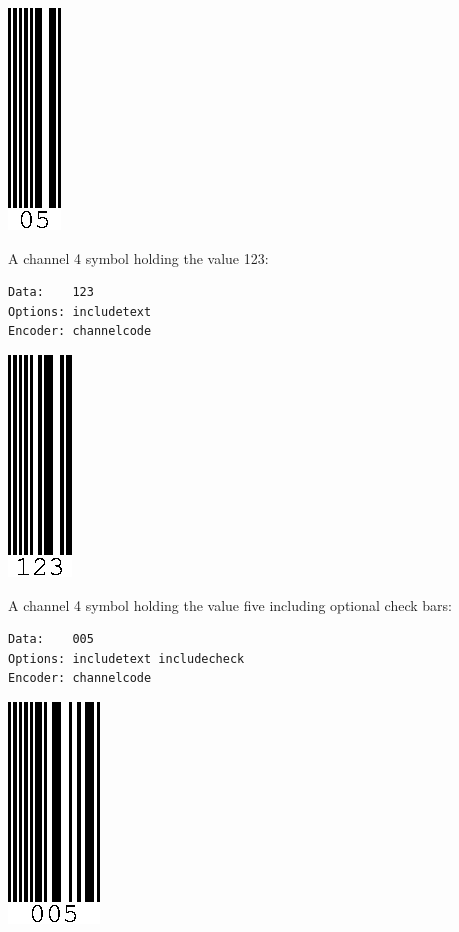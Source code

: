 \includegraphics{images/channelcode-1.eps}

A channel 4 symbol holding the value 123:

\begin{verbatim}
Data:    123
Options: includetext
Encoder: channelcode
\end{verbatim}

\includegraphics{images/channelcode-2.eps}

A channel 4 symbol holding the value five including optional check bars:

\begin{verbatim}
Data:    005
Options: includetext includecheck
Encoder: channelcode
\end{verbatim}

\includegraphics{images/channelcode-3.eps}

